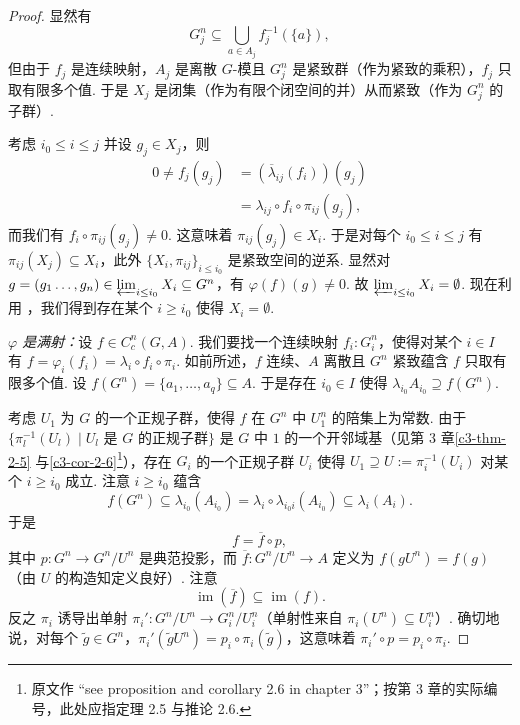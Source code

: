 \begin{proof}
显然有
\[
G_j^n\subseteq\bigcup_{a\in A_j}f_j^{-1}(\{a\}),
\]
但由于 $f_j$ 是连续映射，$A_j$ 是离散 $G$-模且 $G_j^n$ 是紧致群（作为紧致的乘积），$f_j$ 只取有限多个值. 于是 $X_j$ 是闭集（作为有限个闭空间的并）从而紧致（作为 $G_j^n$ 的子群）.

考虑 $i_0\leq i\leq j$ 并设 $g_j\in X_j$，则
\[
\begin{aligned}
0\neq f_j(g_j)&=(\overline{\lambda}_{ij}(f_i))(g_j)\\
&=\lambda_{ij}\circ f_i\circ\pi_{ij}(g_j),
\end{aligned}
\]
而我们有 $f_i\circ\pi_{ij}(g_j)\neq 0$. 这意味着 $\pi_{ij}(g_j)\in X_i$. 于是对每个 $i_0\leq i\leq j$ 有 $\pi_{ij}(X_j)\subseteq X_i$，此外 $\{X_i,\pi_{ij}\}_{i\leq i_0}$ 是紧致空间的逆系. 显然对 $g=(g_1\ldots,g_n)\in\varprojlim_{i\leq i_0}X_i\subseteq G^n$，有 $\varphi(f)(g)\neq 0$. 故 $\varprojlim_{i\leq i_0}X_i=\emptyset$. 现在利用 \cite[Proposition~8, \S9, Chapter~1]{bou71}，我们得到存在某个 $i\geq i_0$ 使得 $X_i=\emptyset$.

\emph{$\varphi$ 是满射：}设 $f\in C^n_c(G,A)$. 我们要找一个连续映射 $f_i:G_i^n$，使得对某个 $i\in I$ 有 $f=\varphi_i(f_i)=\lambda_i\circ f_i\circ\pi_i$. 如前所述，$f$ 连续、$A$ 离散且 $G^n$ 紧致蕴含 $f$ 只取有限多个值. 设 $f(G^n)=\{a_1,\ldots,a_q\}\subseteq A$. 于是存在 $i_0\in I$ 使得 $\lambda_{i_0}A_{i_0}\supseteq f(G^n)$.

考虑 $U_1$ 为 $G$ 的一个正规子群，使得 $f$ 在 $G^n$ 中 $U_1^n$ 的陪集上为常数. 由于 $\{\pi_l^{-1}(U_l)\mid U_l$ 是 $G$ 的正规子群$\}$ 是 $G$ 中 $1$ 的一个开邻域基（见第 3 章\autoref{c3-thm-2-5} 与\autoref{c3-cor-2-6}\footnote{原文作 ``see proposition and corollary 2.6 in chapter 3''；按第 3 章的实际编号，此处应指定理 2.5 与推论 2.6.}），存在 $G_i$ 的一个正规子群 $U_i$ 使得 $U_1\supseteq U:=\pi_i^{-1}(U_i)$ 对某个 $i\geq i_0$ 成立. 注意 $i\geq i_0$ 蕴含
\begin{equation}\label{c5-eq-4}
f(G^n)\subseteq\lambda_{i_0}(A_{i_0})=\lambda_i\circ\lambda_{i_0 i}(A_{i_0})\subseteq\lambda_i(A_i).
\end{equation}
于是
\[
f=\overline{f}\circ p,
\]
其中 $p:G^n\to G^n/U^n$ 是典范投影，而 $\overline{f}:G^n/U^n\to A$ 定义为 $f(gU^n)=f(g)$（由 $U$ 的构造知定义良好）. 注意
\begin{equation}\label{c5-eq-5}
\operatorname{im}(\overline{f})\subseteq\operatorname{im}(f).
\end{equation}
反之 $\pi_i$ 诱导出单射 $\pi_i':G^n/U^n\to G_i^n/U_i^n$（单射性来自 $\pi_i(U^n)\subseteq U_i^n$）. 确切地说，对每个 $\tilde{g}\in G^n$，$\pi_i'(\tilde{g}U^n)=p_i\circ\pi_i(\tilde{g})$，这意味着 $\pi_i'\circ p=p_i\circ\pi_i$.


\end{proof}
